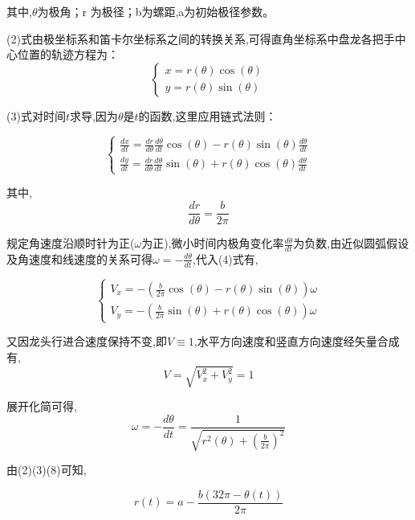 其中,$\theta$为极角；r 为极径；b为螺距,a为初始极径参数。

(2)式由极坐标系和笛卡尔坐标系之间的转换关系,可得直角坐标系中盘龙各把手中心位置的轨迹方程为：
\begin{equation}
	\left\{\begin{matrix}x=r(\theta)\cos(\theta)\\y=r(\theta)\sin(\theta)\end{matrix}\right.
\end{equation}

(3)式对时间$t$求导,因为$\theta$是$t$的函数,这里应用链式法则：

\begin{equation}
	\begin{cases}
		\frac{dx}{dt} = \frac{dr}{d\theta}\frac{d\theta}{dt}\cos(\theta) - r(\theta)\sin(\theta)\frac{d\theta}{dt} \\
		\frac{dy}{dt} = \frac{dr}{d\theta}\frac{d\theta}{dt}\sin(\theta) + r(\theta)\cos(\theta)\frac{d\theta}{dt}
	\end{cases}
\end{equation}

其中,
\begin{equation}
	\frac{dr}{d\theta} = \frac{b}{2\pi}
\end{equation}

规定角速度沿顺时针为正($\omega$为正),微小时间内极角变化率$\frac{d\theta}{dt}$为负数,由近似圆弧假设及角速度和线速度的关系可得$\omega=-\frac{d\theta}{dt}$,代入(4)式有,

\begin{equation}
	\begin{cases}
		V_x = -(\frac{b}{2\pi}\cos(\theta) - r(\theta)\sin(\theta))\omega \\
		V_y = -(\frac{b}{2\pi}\sin(\theta) + r(\theta)\cos(\theta))\omega
	\end{cases}
\end{equation}

又因龙头行进合速度保持不变,即$V \equiv 1 $,水平方向速度和竖直方向速度经矢量合成有,
\begin{equation}
	V=\sqrt{V_x^2+V_y^2}=1
\end{equation}

展开化简可得,
\begin{equation}
	\omega = -\frac{d\theta}{dt} = \frac{1}{\sqrt{r^2(\theta)+(\frac{b}{2\pi})^2}}
\end{equation}

由(2)(3)(8)可知,

\begin{equation}
	r(t) = a - \frac{b(32\pi - \theta(t))}{2\pi}
\end{equation}

